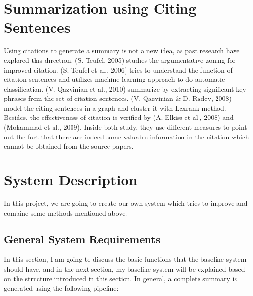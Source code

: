 \documentclass[hyp]{socreport}
\begin{document}
\section{Summarization using Citing Sentences}

  Using citations to generate a summary is not a new idea, as past research have explored 
this direction. (S. Teufel, 2005) studies the argumentative zoning for improved citation. (S. Teufel et al., 2006) tries
 to understand the function of citation sentences and utilizes machine learning approach to do automatic classification. 
(V. Qazvinian et al., 2010) summarize by extracting significant key-phrases from the set of citation sentences. 
(V. Qazvinian \& D. Radev, 2008) model the citing sentences in a graph and cluster it with Lexrank method. Besides, 
the effectiveness of citation is verified by  (A. Elkiss et al., 2008) and (Mohammad et al., 2009). Inside both study, 
they use different measures to point out the fact that there are indeed some valuable information in the citation which 
cannot be obtained from the source papers. 


\section{System Description}

In this project, we are going to create our own system which tries to improve 
and combine some methods mentioned above.

\subsection{General System Requirements}

  In this section, I am going to discuss the basic functions that the baseline system should have, and in the next section, 
my baseline system will be explained based on the structure introduced in this section. In general, a complete summary 
is generated using the following pipeline:
\end{document}
